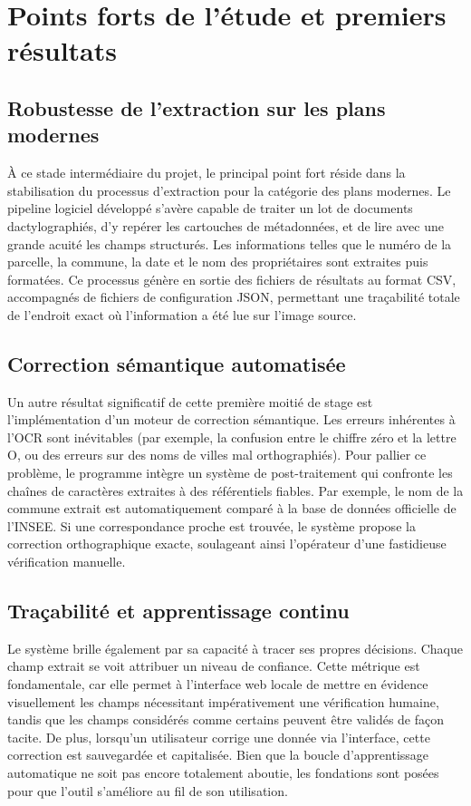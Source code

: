 \documentclass[a4paper,11pt]{article}
\begin{document}
\section{Points forts de l'étude et premiers résultats}

\subsection{Robustesse de l'extraction sur les plans modernes}
À ce stade intermédiaire du projet, le principal point fort réside dans la stabilisation du processus d'extraction pour la catégorie des plans modernes. Le pipeline logiciel développé s'avère capable de traiter un lot de documents dactylographiés, d'y repérer les cartouches de métadonnées, et de lire avec une grande acuité les champs structurés. Les informations telles que le numéro de la parcelle, la commune, la date et le nom des propriétaires sont extraites puis formatées. Ce processus génère en sortie des fichiers de résultats au format CSV, accompagnés de fichiers de configuration JSON, permettant une traçabilité totale de l'endroit exact où l'information a été lue sur l'image source.

\subsection{Correction sémantique automatisée}
Un autre résultat significatif de cette première moitié de stage est l'implémentation d'un moteur de correction sémantique. Les erreurs inhérentes à l'OCR sont inévitables (par exemple, la confusion entre le chiffre zéro et la lettre O, ou des erreurs sur des noms de villes mal orthographiés). Pour pallier ce problème, le programme intègre un système de post-traitement qui confronte les chaînes de caractères extraites à des référentiels fiables. Par exemple, le nom de la commune extrait est automatiquement comparé à la base de données officielle de l'INSEE. Si une correspondance proche est trouvée, le système propose la correction orthographique exacte, soulageant ainsi l'opérateur d'une fastidieuse vérification manuelle.

\subsection{Traçabilité et apprentissage continu}
Le système brille également par sa capacité à tracer ses propres décisions. Chaque champ extrait se voit attribuer un niveau de confiance. Cette métrique est fondamentale, car elle permet à l'interface web locale de mettre en évidence visuellement les champs nécessitant impérativement une vérification humaine, tandis que les champs considérés comme certains peuvent être validés de façon tacite. De plus, lorsqu'un utilisateur corrige une donnée via l'interface, cette correction est sauvegardée et capitalisée. Bien que la boucle d'apprentissage automatique ne soit pas encore totalement aboutie, les fondations sont posées pour que l'outil s'améliore au fil de son utilisation.
\end{document}
